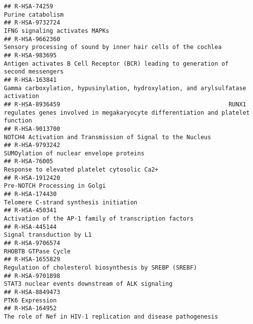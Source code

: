 \documentclass[
]{article}
\begin{document}
\begin{verbatim}
## R-HSA-74259                                                                                                                      Purine catabolism
## R-HSA-9732724                                                                                                       IFNG signaling activates MAPKs
## R-HSA-9662360                                                                       Sensory processing of sound by inner hair cells of the cochlea
## R-HSA-983695                                                    Antigen activates B Cell Receptor (BCR) leading to generation of second messengers
## R-HSA-163841                                                      Gamma carboxylation, hypusinylation, hydroxylation, and arylsulfatase activation
## R-HSA-8936459                                                RUNX1 regulates genes involved in megakaryocyte differentiation and platelet function
## R-HSA-9013700                                                                          NOTCH4 Activation and Transmission of Signal to the Nucleus
## R-HSA-9793242                                                                                             SUMOylation of nuclear envelope proteins
## R-HSA-76005                                                                                           Response to elevated platelet cytosolic Ca2+
## R-HSA-1912420                                                                                                        Pre-NOTCH Processing in Golgi
## R-HSA-174430                                                                                                Telomere C-strand synthesis initiation
## R-HSA-450341                                                                                Activation of the AP-1 family of transcription factors
## R-HSA-445144                                                                                                             Signal transduction by L1
## R-HSA-9706574                                                                                                                  RHOBTB GTPase Cycle
## R-HSA-1655829                                                                              Regulation of cholesterol biosynthesis by SREBP (SREBF)
## R-HSA-9701898                                                                                     STAT3 nuclear events downstream of ALK signaling
## R-HSA-8849473                                                                                                                      PTK6 Expression
## R-HSA-164952                                                                         The role of Nef in HIV-1 replication and disease pathogenesis

\end{verbatim}
\end{document}
